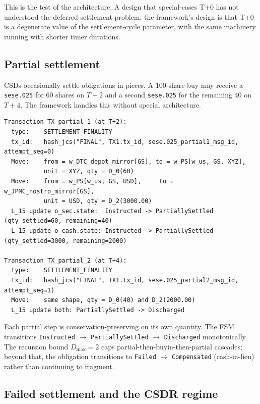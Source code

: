 \documentclass[11pt,a4paper]{article}
\begin{document}
This is the test of the architecture. A design that special-cases T+0 has not understood the deferred-settlement problem; the framework's design is that T+0 is a degenerate value of the settlement-cycle parameter, with the same machinery running with shorter timer durations.

\subsection{Partial settlement}
\label{sec:variant-partial}

CSDs occasionally settle obligations in pieces. A 100-share buy may receive a \texttt{sese.025} for 60 shares on $T+2$ and a second \texttt{sese.025} for the remaining 40 on $T+4$. The framework handles this without special architecture.

\begin{lstlisting}
Transaction TX_partial_1 (at T+2):
  type:    SETTLEMENT_FINALITY
  tx_id:   hash_jcs("FINAL", TX1.tx_id, sese.025_partial1_msg_id, attempt_seq=0)
  Move:    from = w_DTC_depot_mirror[GS], to = w_PS[w_us, GS, XYZ],
           unit = XYZ, qty = D_0(60)
  Move:    from = w_PS[w_us, GS, USD],     to = w_JPMC_nostro_mirror[GS],
           unit = USD, qty = D_2(3000.00)
  L_15 update o_sec.state:  Instructed -> PartiallySettled  (qty_settled=60, remaining=40)
  L_15 update o_cash.state: Instructed -> PartiallySettled  (qty_settled=3000, remaining=2000)

Transaction TX_partial_2 (at T+4):
  type:    SETTLEMENT_FINALITY
  tx_id:   hash_jcs("FINAL", TX1.tx_id, sese.025_partial2_msg_id, attempt_seq=1)
  Move:    same shape, qty = D_0(40) and D_2(2000.00)
  L_15 update both: PartiallySettled -> Discharged
\end{lstlisting}

Each partial step is conservation-preserving on its own quantity. The FSM transitions \texttt{Instructed} $\to$ \texttt{PartiallySettled} $\to$ \texttt{Discharged} monotonically. The recursion bound $D_{\max} = 2$ caps partial-then-buyin-then-partial cascades; beyond that, the obligation transitions to \texttt{Failed} $\to$ \texttt{Compensated} (cash-in-lieu) rather than continuing to fragment.

\subsection{Failed settlement and the CSDR regime}
\label{sec:variant-fail}
\end{document}
